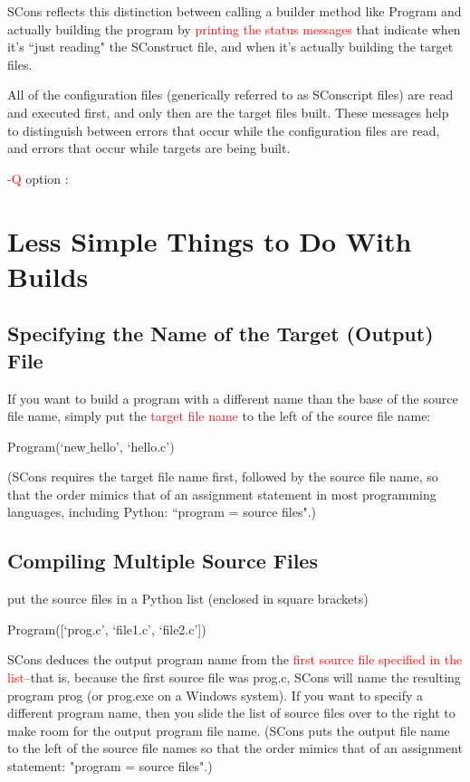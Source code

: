\documentclass[12pt,a4paper]{article}
\begin{document}
SCons reflects this distinction between calling a builder method like Program and actually building the program by \textcolor{red}{printing the status messages} that indicate when it's ``just reading" the SConstruct file, and when it's actually building the target files. 

All of the configuration files (generically referred to as SConscript files) are read and executed first, and only then are the target files built. These messages help to distinguish between errors that occur while the configuration files are read, and errors that occur while targets are being built.

\textcolor{red}{-Q} option : 


\section{Less Simple Things to Do With Builds}

\subsection{Specifying the Name of the Target (Output) File}
If you want to build a program with a different name than the base of the source file name, simply put the \textcolor{red}{target file name} to the left of the source file name:

Program(`new$\_$hello', `hello.c')

(SCons requires the target file name first, followed by the source file name, so that the order mimics that of an assignment statement in most programming languages, including Python: ``program = source files".)

\subsection{Compiling Multiple Source Files}
put the source files in a Python list (enclosed in square brackets)

Program([`prog.c', `file1.c', `file2.c'])

SCons deduces the output program name from the \textcolor{red}{first source file specified in the list}--that is, because the first source file was prog.c, SCons will name the resulting program prog (or prog.exe on a Windows system). If you want to specify a different program name, then you slide the list of source files over to the right to make room for the output program file name. (SCons puts the output file name to the left of the source file names so that the order mimics that of an assignment statement: "program = source files".) 
\end{document}
